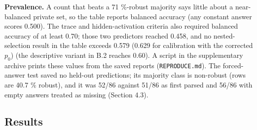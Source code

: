 \documentclass{article}
\begin{document}
\textbf{Prevalence.} A count that beats a 71 \%-robust majority says little about a near-balanced private
set, so the table reports balanced accuracy (any constant answer scores 0.500). The trace and
hidden-activation criteria also required balanced accuracy of at least 0.70; those two predictors reached
0.458, and no nested-selection result in the table exceeds 0.579 (0.629 for calibration with the corrected $p_0$) (the descriptive variant in B.2 reaches 0.60). A script in the supplementary archive prints these values from
the saved reports (\texttt{REPRODUCE.md}). The forced-answer test saved no held-out predictions; its majority class is
non-robust (rows are 40.7 \% robust), and it was 52/86 against 51/86 as first parsed and 56/86 with empty answers treated as missing (Section 4.3).

\subsection{Results}\label{sec:B2}
\end{document}
